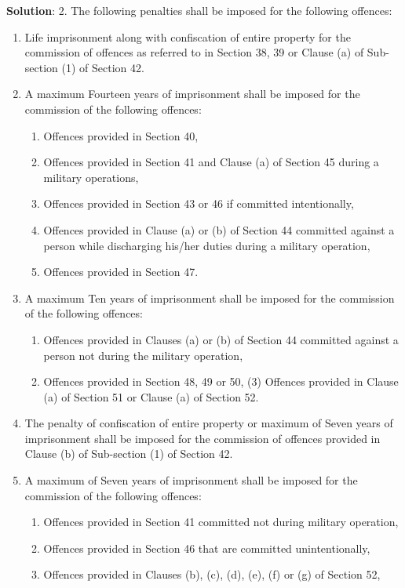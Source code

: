 \documentclass[
  openany]{book}
\newenvironment{solution}{ {\bfseries Solution}:}{}
\begin{document}
\begin{questions}
\begin{solution}
2. The following penalties shall be imposed for the following offences:

\begin{enumerate}
  \item Life imprisonment along with confiscation of entire property for the commission of offences as referred to in Section 38, 39 or Clause (a) of Sub-section (1) of Section 42.
  \item A maximum Fourteen years of imprisonment shall be imposed for the commission of the following offences:
  \begin{enumerate}
    \item Offences provided in Section 40,
    \item Offences provided in Section 41 and Clause (a) of Section 45 during a military operations,
    \item Offences provided in Section 43 or 46 if committed intentionally,
    \item Offences provided in Clause (a) or (b) of Section 44 committed against a person while discharging his/her duties during a military operation,
    \item Offences provided in Section 47.
  \end{enumerate}
  \item A maximum Ten years of imprisonment shall be imposed for the commission of the following offences:
  \begin{enumerate}
    \item Offences provided in Clauses (a) or (b) of Section 44 committed against a person not during the military operation,
    \item Offences provided in Section 48, 49 or 50, (3) Offences provided in Clause (a) of Section 51 or Clause (a) of Section 52.
  \end{enumerate}
  \item The penalty of confiscation of entire property or maximum of Seven years of imprisonment shall be imposed for the commission of offences provided in Clause (b) of Sub-section (1) of Section 42.
  \item A maximum of Seven years of imprisonment shall be imposed for the commission of the following offences:
  \begin{enumerate}
    \item Offences provided in Section 41 committed not during military operation,
    \item Offences provided in Section 46 that are committed unintentionally,
    \item Offences provided in Clauses (b), (c), (d), (e), (f) or (g) of Section 52,

\end{enumerate}
\end{enumerate}
\end{solution}
\end{questions}
\end{document}
